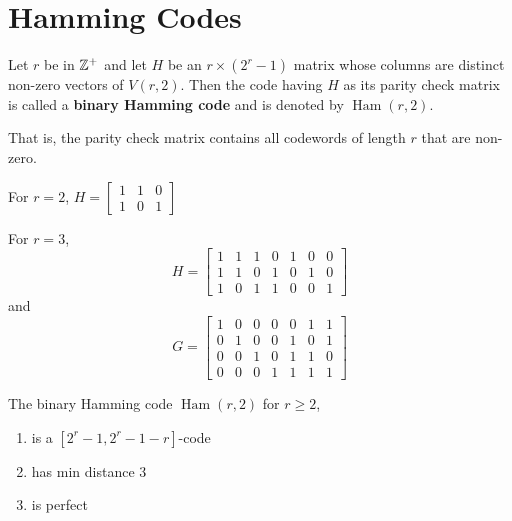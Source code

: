 \documentclass{article}
\DeclareMathOperator{\ham}{Ham}
\begin{document}
\section{Hamming Codes}
\begin{definition}
  Let \( r \) be in \( \mathbb{Z}^+ \) and let \( H \) be an \( r \times (2^r-1) \) matrix whose columns are distinct non-zero vectors of \( V(r, 2) \). Then the code having \( H \) as its parity check matrix is called a \textbf{binary Hamming code} and is denoted by \( \ham(r, 2) \).

  That is, the parity check matrix contains all codewords of length \( r \) that are non-zero.
\end{definition}
\begin{example}
  For \( r = 2 \), \( H = \begin{bmatrix}
    1 & 1 & 0 \\
    1 & 0 & 1
  \end{bmatrix} \)
\end{example}
\begin{example}
  For \( r = 3 \), \[
    H = \begin{bmatrix}
      1 & 1 & 1 & 0 & 1 & 0 & 0 \\
      1 & 1 & 0 & 1 & 0 & 1 & 0 \\
      1 & 0 & 1 & 1 & 0 & 0 & 1
    \end{bmatrix}
  \] and \[
    G = \begin{bmatrix}
      1 & 0 & 0 & 0 & 0 & 1 & 1 \\
      0 & 1 & 0 & 0 & 1 & 0 & 1 \\
      0 & 0 & 1 & 0 & 1 & 1 & 0 \\
      0 & 0 & 0 & 1 & 1 & 1 & 1
    \end{bmatrix}
  \]
\end{example}
\begin{theorem}
  The binary Hamming code \( \ham(r, 2) \) for \( r \ge 2 \), \begin{enumerate}
    \item is a \( [2^r-1, 2^r-1-r] \)-code
    \item has min distance \( 3 \)
    \item is perfect
  \end{enumerate}
\end{theorem}
\end{document}
